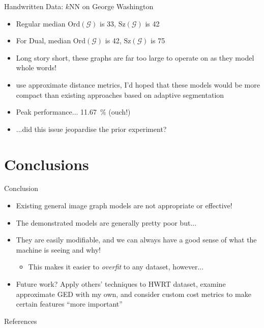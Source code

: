 \documentclass[10pt]{beamer}
\begin{document}
\begin{frame}{Handwritten Data: $k$NN on George Washington}
	\begin{itemize}
		\item Regular median $\text{Ord}(\mathcal{G})$ is 33, $\text{Sz}(\mathcal{G})$ is 42
		\item For Dual, median $\text{Ord}(\mathcal{G})$ is 42, $\text{Sz}(\mathcal{G})$ is 75
		\item Long story short, these graphs are \alert{far too large to operate on} as they model whole words!
		\item \citeauthor{Graphs-Handwriting} use approximate distance metrics, I'd hoped that these models would be more compact than existing approaches based on adaptive segmentation
		\item \alert{Peak performance... \SI{11.67}{\percent} (ouch!)}
		\item ...did this issue jeopardise the prior experiment?
	\end{itemize}
\end{frame}

\section{Conclusions}


\begin{frame}{Conclusion}
	\begin{itemize}[<+- | alert@+>]
		\item Existing general image graph models are not appropriate or effective!
		\item The demonstrated models are generally pretty poor but...
		\item They are easily modifiable, and we can always have a good sense of what the machine is seeing and why!
		\begin{itemize}
			\item This makes it easier to \emph{overfit} to any dataset, however...
		\end{itemize}
		\item Future work? Apply others' techniques to HWRT dataset, examine approximate GED with my own, and consider custom cost metrics to make certain features ``more important''
	\end{itemize}
	
	\pause
	
\end{frame}

\appendix

\begin{frame}[allowframebreaks]{References}

\printbibliography[heading=none]

\end{frame}
\end{document}
